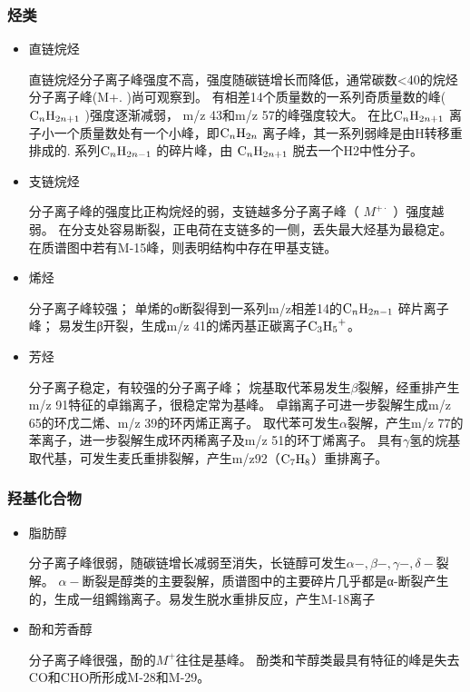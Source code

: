 \subsubsection*{烃类}
\begin{itemize}
    \item 直链烷烃
    
    直链烷烃分子离子峰强度不高，强度随碳链增长而降低，通常碳数<40的烷烃分子离子峰(M+. )尚可观察到。
    有相差14个质量数的一系列奇质量数的峰($\ce{C_{n}H_{2n+1}}$ )强度逐渐减弱， m/z 43和m/z 57的峰强度较大。
    在比$\ce{C_{n}H_{2n+1}}$ 离子小一个质量数处有一个小峰，即$\ce{C_{n}H_{2n}}$ 离子峰，其一系列弱峰是由H转移重排成的.
    系列$\ce{C_{n}H_{2n-1}}$ 的碎片峰，由 $\ce{C_{n}H_{2n+1}}$ 脱去一个H2中性分子。
    \item 支链烷烃
    
    分子离子峰的强度比正构烷烃的弱，支链越多分子离子峰（ $M^{+\cdot}$ ）强度越弱。
    在分支处容易断裂，正电荷在支链多的一侧，丢失最大烃基为最稳定。在质谱图中若有M-15峰，则表明结构中存在甲基支链。
    \item 烯烃
    
    分子离子峰较强；
    单烯的σ断裂得到一系列m/z相差14的$\ce{C_{n}H_{2n-1}}$ 碎片离子峰；
    易发生β开裂，生成m/z 41的烯丙基正碳离子$\ce{C_{3}H_{5}^{+}}$。
    \item 芳烃
    
    分子离子稳定，有较强的分子离子峰；
    烷基取代苯易发生$\beta$裂解，经重排产生m/z 91特征的卓鎓离子，很稳定常为基峰。
    卓鎓离子可进一步裂解生成m/z 65的环戊二烯、m/z 39的环丙烯正离子。
    取代苯可发生$\alpha$裂解，产生m/z 77的苯离子，进一步裂解生成环丙稀离子及m/z 51的环丁烯离子。
    具有$\gamma$氢的烷基取代基，可发生麦氏重排裂解，产生m/z92（$\ce{C_{7}H_{8}}$）重排离子。
\end{itemize}

\subsubsection*{ 羟基化合物}
\begin{itemize}
    \item 脂肪醇

    分子离子峰很弱，随碳链增长减弱至消失，长链醇可发生$\alpha-,\beta-,\gamma-,\delta-$裂解。
    $\alpha-$断裂是醇类的主要裂解，质谱图中的主要碎片几乎都是α-断裂产生的，生成一组鐊鎓离子。易发生脱水重排反应，产生M-18离子
    \item 酚和芳香醇
    
    分子离子峰很强，酚的$M^{+}$往往是基峰。
酚类和苄醇类最具有特征的峰是失去CO和CHO所形成M-28和M-29。
\end{itemize}

